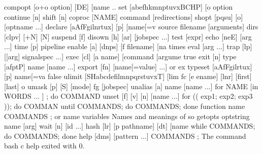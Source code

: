 \documentclass[letterpaper,12pt,english]{sphinxmanual}
\begin{document}
\begin{sphinxVerbatim}[commandchars=\\\{\}]
 compopt [\PYGZhy{}o\textbar{}+o option] [\PYGZhy{}DE] [name ..\PYGZgt{}  set [\PYGZhy{}abefhkmnptuvxBCHP] [\PYGZhy{}o option\PYGZhy{}\PYGZgt{}
 continue [n]                            shift [n]
 coproc [NAME] command [redirections]    shopt [\PYGZhy{}pqsu] [\PYGZhy{}o] [optname ...]
 declare [\PYGZhy{}aAfFgilnrtux] [\PYGZhy{}p] [name[=v\PYGZgt{}  source filename [arguments]
 dirs [\PYGZhy{}clpv] [+N] [\PYGZhy{}N]                  suspend [\PYGZhy{}f]
 disown [\PYGZhy{}h] [\PYGZhy{}ar] [jobspec ...]         test [expr]
 echo [\PYGZhy{}neE] [arg ...]                   time [\PYGZhy{}p] pipeline
 enable [\PYGZhy{}a] [\PYGZhy{}dnps] [\PYGZhy{}f filename] [na\PYGZgt{}  times
 eval [arg ...]                          trap [\PYGZhy{}lp] [[arg] signal\PYGZus{}spec ...]
 exec [\PYGZhy{}cl] [\PYGZhy{}a name] [command [argume\PYGZgt{}  true
 exit [n]                                type [\PYGZhy{}afptP] name [name ...]
 export [\PYGZhy{}fn] [name[=value] ...] or ex\PYGZgt{}  typeset [\PYGZhy{}aAfFgilrtux] [\PYGZhy{}p] name[=va\PYGZgt{}
 false                                   ulimit [\PYGZhy{}SHabcdefilmnpqrstuvxT] [lim\PYGZgt{}
 fc [\PYGZhy{}e ename] [\PYGZhy{}lnr] [first] [last] o\PYGZgt{}  umask [\PYGZhy{}p] [\PYGZhy{}S] [mode]
 fg [job\PYGZus{}spec]                           unalias [\PYGZhy{}a] name [name ...]
 for NAME [in WORDS ... ] ; do COMMAND\PYGZgt{}  unset [\PYGZhy{}f] [\PYGZhy{}v] [\PYGZhy{}n] [name ...]
 for (( exp1; exp2; exp3 )); do COMMAN\PYGZgt{}  until COMMANDS; do COMMANDS; done
 function name \PYGZob{} COMMANDS ; \PYGZcb{} or name \PYGZgt{}  variables \PYGZhy{} Names and meanings of so\PYGZgt{}
 getopts optstring name [arg]            wait [\PYGZhy{}n] [id ...]
 hash [\PYGZhy{}lr] [\PYGZhy{}p pathname] [\PYGZhy{}dt] [name \PYGZgt{}  while COMMANDS; do COMMANDS; done
 help [\PYGZhy{}dms] [pattern ...]               \PYGZob{} COMMANDS ; \PYGZcb{}
The command \PYGZdq{}bash \PYGZhy{}c help\PYGZdq{} exited with 0.
\end{sphinxVerbatim}
\end{document}
